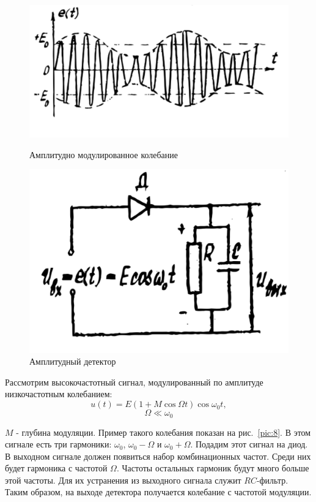\begin{figure}[H]
	\centering
	\begin{minipage}{0.49\linewidth}
		\includegraphics[width=\textwidth]{picture/pic8.jpg}
		\caption{Амплитудно модулированное колебание}
		\label{pic:8}
	\end{minipage}
	\begin{minipage}{0.49\linewidth}
		\centering
		\includegraphics[width=.8\textwidth]{picture/pic9.jpg}
		\caption{Амплитудный детектор}
		\label{pic:9}
	\end{minipage}	
\end{figure}

Рассмотрим высокочастотный сигнал, модулированный по амплитуде низкочастотным колебанием:
$$u(t)=E(1+M\cos{\Omega t})\cos{\omega_0 t},$$  $$\Omega \ll \omega_0 $$

$M$ - глубина модуляции. Пример такого колебания показан на рис.~\ref{pic:8}. В этом сигнале есть три гармоники: $ \omega_0 $, $ \omega_0 - \Omega$ и $\omega_0 + \Omega$. Подадим этот сигнал на диод. В выходном сигнале должен появиться набор комбинационных частот. Среди них будет гармоника с частотой $\Omega$. Частоты остальных гармоник будут много больше этой частоты. Для их устранения из выходного сигнала служит $RC$-фильтр. Таким образом, на выходе детектора получается колебание с частотой модуляции.



